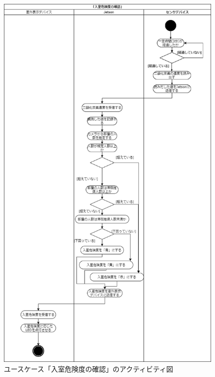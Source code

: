 \begin{figure}[htbp]
    \centering
    \includegraphics[width = 12cm]{./picture/activity_enterlisk_1.eps}
    \caption{ユースケース「入室危険度の確認」のアクティビティ図}
    \label{act_enterlisk}
\end{figure}
